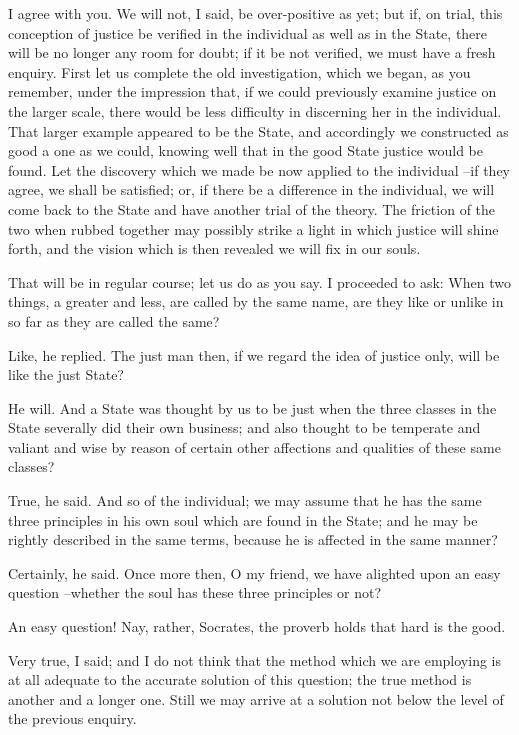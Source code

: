 I agree with you.
We will not, I said, be over-positive as yet; but if, on trial, this conception of justice be verified in the individual as well as in the State, there will be no longer any room for doubt; if it be not verified, we must have a fresh enquiry. First let us complete the old investigation, which we began, as you remember, under the impression that, if we could previously examine justice on the larger scale, there would be less difficulty in discerning her in the individual. That larger example appeared to be the State, and accordingly we constructed as good a one as we could, knowing well that in the good State justice would be found. Let the discovery which we made be now applied to the individual --if they agree, we shall be satisfied; or, if there be a difference in the individual, we will come back to the State and have another trial of the theory. The friction of the two when rubbed together may possibly strike a light in which justice will shine forth, and the vision which is then revealed we will fix in our souls.

That will be in regular course; let us do as you say.
I proceeded to ask: When two things, a greater and less, are called by the same name, are they like or unlike in so far as they are called the same?

Like, he replied.
The just man then, if we regard the idea of justice only, will be like the just State?

He will.
And a State was thought by us to be just when the three classes in the State severally did their own business; and also thought to be temperate and valiant and wise by reason of certain other affections and qualities of these same classes?

True, he said.
And so of the individual; we may assume that he has the same three principles in his own soul which are found in the State; and he may be rightly described in the same terms, because he is affected in the same manner?

Certainly, he said.
Once more then, O my friend, we have alighted upon an easy question --whether the soul has these three principles or not?

An easy question! Nay, rather, Socrates, the proverb holds that hard is the good.

Very true, I said; and I do not think that the method which we are employing is at all adequate to the accurate solution of this question; the true method is another and a longer one. Still we may arrive at a solution not below the level of the previous enquiry.

